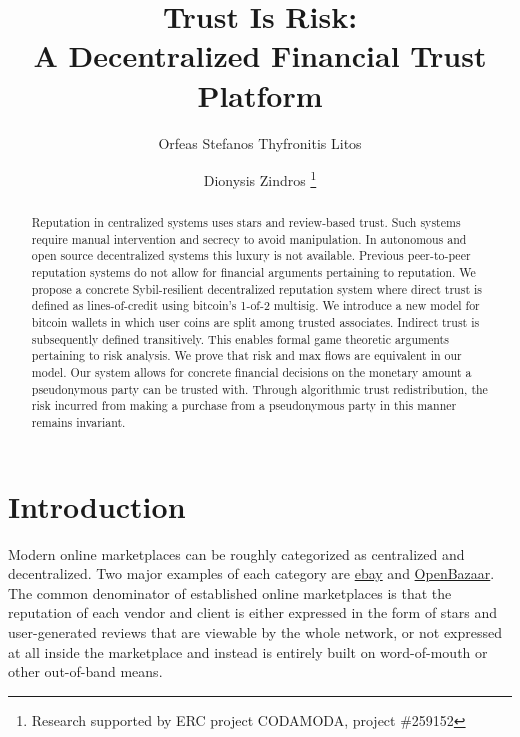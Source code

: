 \documentclass[11pt]{llncs}
\theoremstyle{definition}
\begin{document}
\title{Trust Is Risk: \\ A Decentralized Financial Trust Platform}
\author{Orfeas Stefanos Thyfronitis Litos%
        \and Dionysis Zindros \fnmsep \thanks{Research supported by ERC project CODAMODA, project \#259152}}
\maketitle
\thispagestyle{plain}
  \begin{abstract}
     Reputation in centralized systems uses stars and review-based trust. Such systems require manual intervention and
     secrecy to avoid manipulation. In autonomous and open source decentralized systems this luxury is not available.
     Previous peer-to-peer reputation systems do not allow for financial arguments pertaining to reputation. We propose a
     concrete Sybil-resilient decentralized reputation system where direct trust is defined as lines-of-credit using
     bitcoin's 1-of-2 multisig. We introduce a new model for bitcoin wallets in which user coins are split among trusted
     associates. Indirect trust is subsequently defined transitively. This enables formal game theoretic arguments pertaining
     to risk analysis. We prove that risk and max flows are equivalent in our model. Our system allows for concrete financial
     decisions on the monetary amount a pseudonymous party can be trusted with. Through algorithmic trust redistribution, the
     risk incurred from making a purchase from a pseudonymous party in this manner remains invariant.
  \end{abstract}

  \section{Introduction}
     Modern online marketplaces can be roughly categorized as centralized and decentralized.
     Two major examples of each category are \href{http://www.ebay.com}{ebay} and \href{https://openbazaar.org/}{OpenBazaar}.
     The common denominator of established online marketplaces is that the reputation of each vendor and client is either
     expressed in the form of stars and user-generated reviews that are viewable by the whole network, or not expressed at
     all inside the marketplace and instead is entirely built on word-of-mouth or other out-of-band means.
\end{document}
